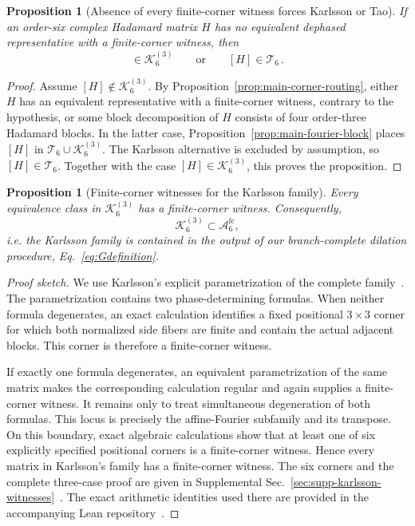 \documentclass[aps,prx,reprint,nofootinbib,twoside,superscriptaddress,longbibliography,floatfix]{revtex4-2}
\newtheorem{proposition}[theorem]{Proposition}
\theoremstyle{definition}
\newcommand{\KK}{\mathcal K}
\newcommand{\FCAtlas}{\mathcal A}
\begin{document}
\begin{proposition}[Absence of every finite-corner witness forces Karlsson or Tao]
\label{thm:finitecornerintro}
If an order-six complex Hadamard matrix $H$ has no equivalent dephased representative with a finite-corner witness, then
\begin{equation}
[H]\in\KK_6^{(3)}
\qquad\text{or}\qquad
[H]\in\mathcal T_6 \,.
\label{eq:failed-search-routing}
\end{equation}
\end{proposition}

\begin{proof}
Assume $[H]\notin\KK_6^{(3)}$. By
Proposition~\ref{prop:main-corner-routing}, either $H$ has an equivalent representative with a finite-corner witness, contrary to the hypothesis, or some block decomposition of $H$ consists of four order-three Hadamard blocks. In the latter case, Proposition~\ref{prop:main-fourier-block} places
$[H]$ in
$\mathcal T_6\cup\KK_6^{(3)}$. The Karlsson alternative is excluded by assumption, so
$[H]\in\mathcal T_6$. 
Together with the case $[H]\in\KK_6^{(3)}$, this proves the proposition.
\end{proof}

\begin{proposition}[Finite-corner witnesses for the Karlsson family]
\label{prop:karlsson-finite-corner}
Every equivalence class in $\KK_6^{(3)}$ has a finite-corner witness. Consequently,
\begin{equation}
\KK_6^{(3)}\subset\FCAtlas_6^{\mathrm{fc}},
\label{eq:karlsson-finite-corner-main}
\end{equation}
i.e. the Karlsson family is contained in the output of our branch-complete dilation procedure, Eq.~\eqref{eq:Gdefinition}.
\end{proposition}

\begin{proof}[Proof sketch]
We use Karlsson's explicit parametrization of the complete
family~\cite{Karlsson2011H2,Karlsson2011ThreeParameter}. The parametrization contains two phase-determining formulas. When neither formula degenerates, an exact calculation identifies a fixed positional $3\times3$ corner for which both normalized side fibers are finite and contain the actual adjacent blocks. This corner is therefore a finite-corner witness.

If exactly one formula degenerates, an equivalent parametrization of the same matrix makes the corresponding calculation regular and again supplies a finite-corner witness. It remains only to treat simultaneous degeneration of both formulas. This locus is precisely the affine-Fourier subfamily and its transpose. On this boundary, exact algebraic calculations show that at least one of six explicitly specified positional corners is a finite-corner witness. Hence every matrix in Karlsson's family has a finite-corner witness. The six corners and the complete three-case proof are given in Supplemental Sec.~\ref{sec:supp-karlsson-witnesses}~\cite{SupplementalMaterial}. The exact arithmetic identities used there are provided in the accompanying Lean repository~\cite{CardenesWuttig2026HadamardRepository}.
\end{proof}
\end{document}
